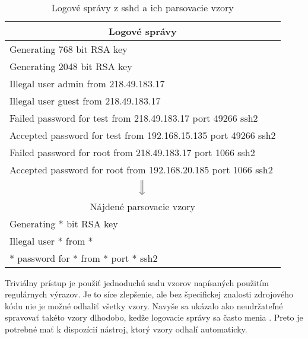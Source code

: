 \begin{table}[htbp]
\centering
\begin{tabularx}{\textwidth}{X}
\multicolumn{1}{c}{Logové správy}                                                                 \\ \hline
Generating 768 bit RSA key                                     \\
Generating 2048 bit RSA key                                    \\
Illegal user admin from 218.49.183.17                          \\
Illegal user guest from 218.49.183.17                          \\
Failed password for test from 218.49.183.17 port 49266 ssh2    \\
Accepted password for test from 192.168.15.135 port 49266 ssh2 \\
Failed password for root from 218.49.183.17 port 1066 ssh2     \\
Accepted password for root from 192.168.20.185 port 1066 ssh2  \\
\multicolumn{1}{c}{\multirow{2}{*}{ $\Big\Downarrow$ }}                                                             \\
\multicolumn{1}{c}{}                                                                              \\
\multicolumn{1}{c}{Nájdené parsovacie vzory}                                                      \\ \hline
Generating * bit RSA key                                      \\
Illegal user * from *                                          \\
* password for * from * port * ssh2                           
\end{tabularx}
\caption{Logové správy z sshd a ich parsovacie vzory}
\label{tab:a}
\end{table}

\par Triviálny prístup je použiť jednoduchú sadu vzorov napísaných použitím regulárnych výrazov. Je to síce zlepšenie, ale bez špecifickej znalosti zdrojového kódu nie je možné odhaliť všetky vzory. Navyše sa ukázalo ako neudržateľné spravovať takéto vzory dlhodobo, kedže logovacie správy sa často menia \parencite{xu2010}. Preto je potrebné mať k dispozícií nástroj, ktorý vzory odhalí automaticky.








